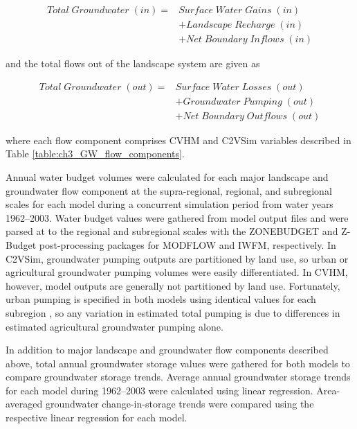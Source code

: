 \begin{equation}
\begin{aligned}
Total \; Groundwater \; (in) ={} & Surface \; Water \; Gains \; (in) \\
& + Landscape \; Recharge \; (in) \\
& + Net \; Boundary \; Inflows \; (in)
\end{aligned}
\end{equation}

\noindent and the total flows out of the landscape system are given as

\begin{equation}
\begin{aligned}
Total \; Groundwater \; (out) ={} & Surface \; Water \; Losses \; (out) \\
& + Groundwater \; Pumping \; (out) \\
& + Net \; Boundary \; Outflows \; (out)
\end{aligned}
\end{equation}

\noindent where each flow component comprises CVHM and C2VSim variables described in Table \ref{table:ch3_GW_flow_components}.



Annual water budget volumes were calculated for each major landscape and groundwater flow component at the supra-regional, regional, and subregional scales for each model during a concurrent simulation period from water years 1962--2003. Water budget values were gathered from model output files and were parsed at to the regional and subregional scales with the ZONEBUDGET and Z-Budget post-processing packages for MODFLOW and IWFM, respectively. In C2VSim, groundwater pumping outputs are partitioned by land use, so urban or agricultural groundwater pumping volumes were easily differentiated. In CVHM, however, model outputs are generally not partitioned by land use. Fortunately, urban pumping is specified in both models using identical values for each subregion \citep{brush2013development,faunt2009groundwater}, so any variation in estimated total pumping is due to differences in estimated agricultural groundwater pumping alone.

In addition to major landscape and groundwater flow components described above, total annual groundwater storage values were gathered for both models to compare groundwater storage trends. Average annual groundwater storage trends for each model during 1962--2003 were calculated using linear regression. Area-averaged groundwater change-in-storage trends were compared using the respective linear regression for each model.

